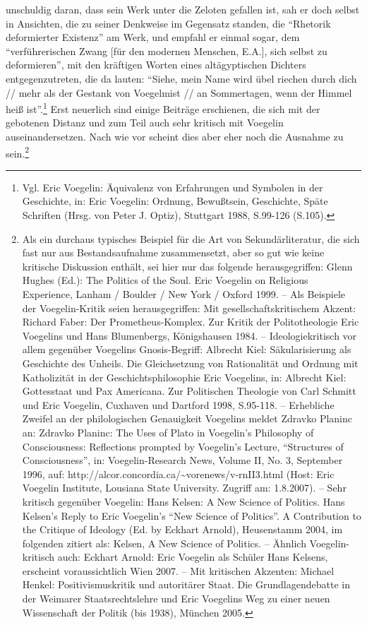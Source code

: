 unschuldig daran, dass sein Werk unter die Zeloten gefallen ist, sah er doch
selbst in Ansichten, die zu seiner Denkweise im Gegensatz standen, die
"`Rhetorik deformierter Existenz"' am Werk, und empfahl er einmal sogar, dem
"`verführerischen Zwang [für den modernen Menschen, E.A.], sich selbst zu
deformieren"', mit den kräftigen Worten eines altägyptischen Dichters
entgegenzutreten, die da lauten: "`Siehe, mein Name wird übel riechen durch
dich // mehr als der Gestank von Voegelmist // an Sommertagen, wenn der Himmel
heiß ist"'.\footnote{Vgl. Eric Voegelin: Äquivalenz von Erfahrungen und
  Symbolen in der Geschichte, in: Eric Voegelin: Ordnung, Bewußtsein,
  Geschichte, Späte Schriften (Hrsg. von Peter J. Optiz), Stuttgart 1988,
  S.99-126 (S.105).}  Erst neuerlich sind einige Beiträge erschienen, die sich
mit der gebotenen Distanz und zum Teil auch sehr kritisch mit Voegelin
auseinandersetzen. Nach wie vor scheint dies aber eher noch die Ausnahme zu
sein.\footnote{Als ein durchaus typisches Beispiel für die Art von
  Sekundärliteratur, die sich fast nur aus Bestandsaufnahme zusammensetzt,
  aber so gut wie keine kritische Diskussion enthält, sei hier nur das
  folgende herausgegriffen: Glenn Hughes (Ed.): The Politics of the Soul. Eric
  Voegelin on Religious Experience, Lanham / Boulder / New York / Oxford 1999.
  -- Als Beispiele der Voegelin-Kritik seien herausgegriffen: Mit
  gesellschaftskritischem Akzent: Richard Faber: Der Prometheus-Komplex.  Zur
  Kritik der Politotheologie Eric Voegelins und Hans Blumenbergs, Königshausen
  1984. -- Ideologiekritisch vor allem gegenüber Voegelins Gnosis-Begriff:
  Albrecht Kiel: Säkularisierung als Geschichte des Unheils.  Die
  Gleichsetzung von Rationalität und Ordnung mit Katholizität in der
  Geschichtsphilosophie Eric Voegelins, in: Albrecht Kiel: Gottesstaat und Pax
  Americana. Zur Politischen Theologie von Carl Schmitt und Eric Voegelin,
  Cuxhaven und Dartford 1998, S.95-118. -- Erhebliche Zweifel an der
  philologischen Genauigkeit Voegelins meldet Zdravko Planinc an: Zdravko
  Planinc: The Uses of Plato in Voegelin's Philosophy of Consciousness:
  Reflections prompted by Voegelin's Lecture, "`Structures of Consciousness"',
  in: Voegelin-Research News, Volume II, No.  3, September 1996, auf:
  http://alcor.concordia.ca/\~{ }vorenews/v-rnII3.html (Host: Eric Voegelin
  Institute, Lousiana State University. Zugriff am: 1.8.2007). -- Sehr
  kritisch gegenüber Voegelin: Hans Kelsen: A New Science of Politics. Hans
  Kelsen's Reply to Eric Voegelin's "`New Science of Politics"'. A
  Contribution to the Critique of Ideology (Ed. by Eckhart Arnold),
  Heusenstamm 2004, im folgenden zitiert als: Kelsen, A New Science of
  Politics. -- Ähnlich Voegelin-kritisch auch: Eckhart Arnold: Eric Voegelin
  als Schüler Hans Kelsens, erscheint voraussichtlich Wien 2007. -- Mit
  kritischen Akzenten: Michael Henkel: Positivismuskritik und
  autoritärer Staat. Die Grundlagendebatte in der Weimarer Staatsrechtslehre
  und Eric Voegelins Weg zu einer neuen Wissenschaft der Politik (bis 1938),
  München 2005.}

